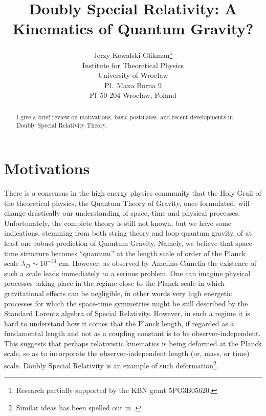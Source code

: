 \documentclass[a4paper,a4paper]{article}
\begin{document}

\title{Doubly Special Relativity: A Kinematics of Quantum Gravity?}

\author{Jerzy Kowalski-Glikman\footnote{Research  partially supported
by the    KBN grant 5PO3B05620.}\\Institute for Theoretical
Physics\\ University of Wroc\l{}aw\\ Pl.\ Maxa Borna 9\\
Pl--50-204 Wroc\l{}aw, Poland}

\maketitle

\begin{abstract}
  I give a brief review on motivations, basic postulates, and recent developments in Doubly Special Relativity Theory.
\end{abstract}



\section{Motivations}

There is a consensus in the high energy physics community that the Holy Grail of the theoretical physics, the Quantum Theory of Gravity, once formulated, will change drastically our understanding of space, time and physical processes. Unfortunately, the complete theory is still not known, but we have some indications, stemming from both string theory and loop quantum gravity, of at least one robust prediction of Quantum Gravity. Namely, we believe that space-time structure becomes ``quantum'' at the length scale of order of the Planck scale $\lambda_{Pl} \sim 10^{-33} $ cm. However, as observed by Amelino-Camelia \cite{gac} the existence of such a scale leads immediately to a serious problem. One can imagine physical processes taking place in the regime close to the Planck scale in which gravitational effects can be negligible, in other words very high energetic processes for which the space-time symmetries might be still described by the Standard Lorentz algebra of Special Relativity. However, in such a regime it is hard to understand how it comes that the Planck length, if regarded as a fundamental length and not as a coupling constant is to be observer-independent. This suggests that perhaps relativistic kinematics is being deformed at the Planck scale, so as to incorporate the observer-independent length (or, mass, or time) scale. Doubly Special Relativity is an example of such deformation\footnote{Similar ideas has been spelled out in \cite{ahluwalia}.}.
\end{document}
